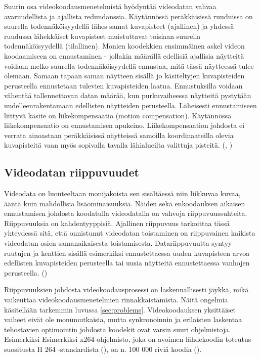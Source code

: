 Suurin osa videokoodausmenetelmistä hyödyntää videodatan vahvaa
avaruudellista ja ajallista redundanssia. Käytännössä peräkkäisissä
ruuduissa on suurella todennäköisyydellä lähes samat kuvapisteet (ajallinen) ja
yhdessä ruudussa lähekkäiset kuvapisteet muistuttavat toisiaan suurella
todennäköisyydellä (tilallinen). Monien koodekkien ensimmäinen askel videon koodaamiseen
on ennustaminen - jollakin määrällä edellisiä ajallisia näytteitä voidaan
melko suurella todennäköisyydellä ennustaa, mitä tässä näytteessä tulee
olemaan. Samaan tapaan saman näytteen sisällä jo käsiteltyjen kuvapisteiden
perusteella ennustetaan tulevien kuvapisteiden laatua. Ennustuksilla voidaan
vähentää tallennettavan datan määrää, kun purkuvaiheessa näytteitä pystytään
uudelleenrakentamaan edellisten näytteiden perusteella. Läheisesti
ennustamiseen liittyvä käsite on liikekompensaatio (motion compensation).
Käytännössä liikekompensaatio on ennustamisen apukeino. Liikekompensaation
johdosta ei verrata
ainoastaan peräkkäisissä näytteissä samoilla koordinaateilla
olevia kuvapisteitä vaan myös sopivalla tavalla lähialueilta valittuja
pisteitä. (\citealt{h264}, \citealt{du})

\subsection{Videodatan riippuvuudet}
\label{sec:depend}

Videodata on luonteeltaan monijakoista sen sisältäessä niin liikkuvaa kuvaa,
ääntä kuin mahdollisia lisäominaisuuksia. Näiden sekä
enkoodauksen aikaisen ennustamisen johdosta koodatulla videodatalla on vahvoja
riippuvuussuhteita. Riippuvuuksia on kahdentyyppisiä. Ajallinen riippuvuus
tarkoittaa tässä yhteydessä sitä, että onnistunut videodatan
toistaminen on riippuvainen kaikista videodatan osien samanaikaisesta
toistamisesta. Datariippuvuutta syntyy ruutujen ja kenttien
sisällä esimerkiksi ennustettaessa uuden kuvapisteen arvoa edellisten
kuvapisteiden perusteella tai uusia näytteitä ennustettaessa  vanhojen
perusteella. (\citealt{mujal})

Riippuvuuksien johdosta videokoodausprosessi on laskennallisesti jäykkä, mikä
vaikeuttaa videokoodausmenetelmien rinnakkaistamista. Näitä ongelmia
käsitellään tarkemmin luvussa \ref{sec:problems}. Videokoodauksen yksittäiset
vaiheet eivät ole monumutkaisia, mutta synkronoinnin ja erilaisten laskentaa
tehostavien optimointin johdosta koodekit ovat varsin suuri ohjelmistoja. Esimerkiksi
Esimerkiksi x264-ohjelmisto, joka on avoimen lähdekoodin toteutus
suositusta H 264 -standardista (\citealt{h264}), on n. 100 000 riviä koodia (\citealt{x264}).


